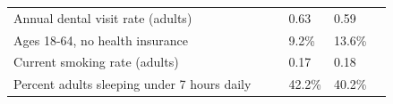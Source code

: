 \documentclass[9pt]{report}
\begin{document}
\begin{tabular}{p{.10in}p{.10in}p{.10in}p{3.7in}>{\hfill}p{.85in}>{\hfill}p{.85in}>{\hfill}p{.85in}>{\hfill}p{.85in}p{0.1in}}
\multicolumn{4}{l}{\parbox{3.6in}{\strut\raggedright{{Annual dental visit rate (adults)}}\strut}} &  &  & 0.63 & 0.59 & \multicolumn{1}{l}{}  \\ 
\multicolumn{4}{l}{\parbox{3.6in}{\strut\raggedright{{Ages 18-64, no health insurance}}\strut}} &  &  & 9.2\% & 13.6\% & \multicolumn{1}{l}{}  \\ 
\multicolumn{4}{l}{\parbox{3.6in}{\strut\raggedright{{Current smoking rate (adults)}}\strut}} &  &  & 0.17 & 0.18 & \multicolumn{1}{l}{}  \\ 
\multicolumn{4}{l}{\parbox{3.6in}{\strut\raggedright{{Percent adults sleeping under 7 hours daily}}\strut}} &  &  & 42.2\% & 40.2\% & \multicolumn{1}{l}{}  \\ 

\end{tabular}
\setlength{\tabcolsep}{6pt} %


\vspace{36pt}
\linespread{1.5}
\theendnotes
\end{document}
